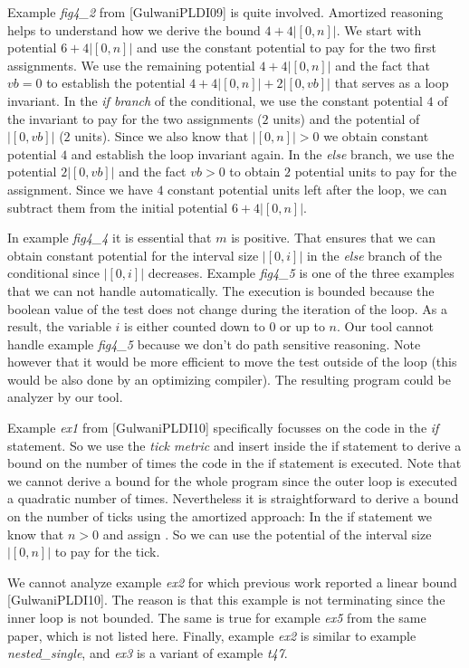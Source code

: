 \documentclass[nocopyrightspace,preprint]{sigplanconf}
\begin{document}
Example \emph{fig4\_2} from [GulwaniPLDI09] is quite involved.
Amortized reasoning helps to understand how we derive the bound $4 +
4|[0, n]|$.  We start with potential $6 + 4|[0, n]|$ and use the
constant potential to pay for the two first assignments.  We use the
remaining potential $4 + 4|[0, n]|$ and the fact that $vb=0$ to
establish the potential $4 + 4|[0, n]| + 2|[0,vb]|$ that serves as a
loop invariant.  In the \emph{if branch} of the conditional, we use
the constant potential $4$ of the invariant to pay for the two
assignments ($2$ units) and the potential of $|[0,vb]|$ ($2$ units).
Since we also know that $|[0, n]|>0$ we obtain constant potential $4$
and establish the loop invariant again.  In the \emph{else} branch, we
use the potential $2|[0,vb]|$ and the fact $vb>0$ to obtain $2$
potential units to pay for the assignment.  Since we have $4$ constant
potential units left after the loop, we can subtract them from the
initial potential $6 + 4|[0, n]|$.

In example \emph{fig4\_4} it is essential that $m$ is positive.
That ensures that we can obtain constant potential for the interval
size $|[0,i]|$ in the \emph{else} branch of the conditional since
$|[0,i]|$ decreases.  Example \emph{fig4\_5} is one of the three
examples that we can not handle automatically.  The execution is
bounded because the boolean value of the test  does not
change during the iteration of the loop.  As a result, the variable
$i$ is either counted down to $0$ or up to $n$.  Our tool cannot
handle example \emph{fig4\_5} because we don't do path sensitive
reasoning.  Note however that it would be more efficient to move the
test  outside of the loop (this would be also done by
an optimizing compiler).  The resulting program could be analyzer by our
tool.

Example \emph{ex1} from [GulwaniPLDI10] specifically focusses on the
code in the \emph{if} statement.  So we use the \emph{tick metric} and
insert  inside the if statement to derive a bound on
the number of times the code in the if statement is executed.  Note
that we cannot derive a bound for the whole program since the outer
loop is executed a quadratic number of times.  Nevertheless it is
straightforward to derive a bound on the number of ticks using the
amortized approach: In the if statement we know that $n>0$ and assign
.  So we can use the potential of the interval size $|[0,n]|$
to pay for the tick.

We cannot analyze example \emph{ex2} for which previous work reported
a linear bound [GulwaniPLDI10].  The reason is that this example is
not terminating since the inner loop is not bounded.  The same is true
for example \emph{ex5} from the same paper, which is not listed here.
Finally, example \emph{ex2} is similar to example
\emph{nested\_single}, and \emph{ex3} is a variant of example
\emph{t47}.
\end{document}
